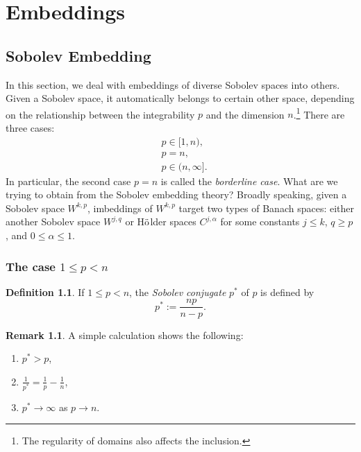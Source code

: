 \documentclass[11pt,a4paper]{report}
\theoremstyle{definition}
\newtheorem{definition}[theorem]{Definition}
\newtheorem{remark}[theorem]{Remark}
\begin{document}
\chapter{Embeddings}


\section{Sobolev Embedding}

In this section, we deal with embeddings of diverse Sobolev spaces into others.
Given a Sobolev space, it automatically belongs to certain other space, depending on the relationship between the integrability $p$ and the dimension $n$.\footnote{The regularity of domains also affects the inclusion.}
There are three cases:
\begin{align*}
    &p \in [1, n), \\
    &p = n, \\
    &p \in (n, \infty].
\end{align*}
In particular, the second case $p = n$ is called the \emph{borderline case}. 
What are we trying to obtain from the Sobolev embedding theory?
Broadly speaking, given a Sobolev space $W^{k, p}$, imbeddings of $W^{k, p}$ target two types of Banach spaces: either another Sobolev space $W^{j, q}$ or H$\ddot{\rm o}$lder spaces $C^{j, \alpha}$ for some constants $j \leq k$, $q \geq p$, and $0 \leq \alpha \leq 1$.

\subsection{The case $1 \leq p < n$}

\begin{definition}
    If $1 \leq p < n$, the \emph{Sobolev conjugate} $p^{\ast}$ of $p$ is defined by 
    \begin{equation*} 
        p^{\ast} := \frac{np}{n-p}.
    \end{equation*}
\end{definition}

\begin{remark}
    A simple calculation shows the following:
    \begin{enumerate}[label=(\roman*)] 
    \rm\item $p^{\ast} > p$,
    \rm\item $\displaystyle \frac{1}{p^{\ast}} = \frac{1}{p} - \frac{1}{n}$,
    \rm\item $p^{\ast} \to \infty$ as $p \to n$.
    \end{enumerate}
\end{remark}
\end{document}
